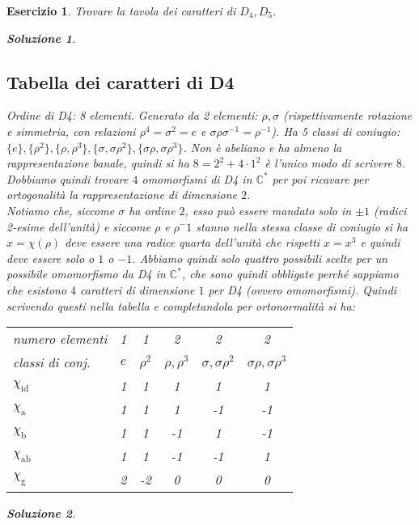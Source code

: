\documentclass[a4paper]{article}
\theoremstyle{break}
\newtheorem{ex}{{ \Large Esercizio} }
\theoremstyle{plain}
\newtheorem{sol}{Soluzione}[ex]
\newcommand{\bbC}{\mathbb{C}}
\begin{document}
\begin{ex}
Trovare la tavola dei caratteri di $D_4, D_5$.

\begin{sol}
\subsection{Tabella dei caratteri di D4}
	Ordine di D4: 8 elementi. Generato da 2 elementi: $\rho, \sigma$ (rispettivamente rotazione e simmetria, con relazioni $\rho^4 = \sigma^2 = e$ e $\sigma \rho \sigma^{-1} = \rho^{-1}$). Ha 5 classi di coniugio: $\{e\}, \{\rho^2\}, \{\rho, \rho^3\}, \{\sigma, \sigma\rho^2\}, \{\sigma\rho, \sigma\rho^3\}$. Non è abeliano e ha almeno la rappresentazione banale, quindi si ha $8 = 2^2 + 4 \cdot 1^2$ è l'unico modo di scrivere $8$. Dobbiamo quindi trovare $4$ omomorfismi di D4 in $\bbC^{*}$ per poi ricavare per ortogonalità la rappresentazione di dimensione $2$. \\
	Notiamo che, siccome $\sigma$ ha ordine $2$, esso può essere mandato solo in $\pm 1$ (radici 2-esime dell'unità) e siccome $\rho$ e $\rho^-1$ stanno nella stessa classe di coniugio si ha $x = \chi(\rho)$ deve essere una radice quarta dell'unità che rispetti $x = x^3$ e quindi deve essere solo o $1$ o $-1$. Abbiamo quindi solo quattro possibili scelte per un possibile omomorfismo da D4 in $\bbC^{*}$, che sono quindi obbligate perché sappiamo che esistono $4$ caratteri di dimensione $1$ per D4 (ovvero omomorfismi). Quindi scrivendo questi nella tabella e completandola per ortonormalità si ha: \\
	\begin{center} \begin{tabular}{lccccc}
	numero elementi   & 1   & 1   & 2   & 2   & 2   \\
	classi di conj.   & $e$  & $\rho^2$ & $\rho, \rho^3$ & $\sigma, \sigma\rho^2$ & $\sigma\rho, \sigma\rho^3$ \\ \hline
	$\chi_\text{id}$  & 1   & 1   & 1   & 1   & 1   \\
	$\chi_\text{a}$   & 1   & 1   & 1   & -1  & -1  \\
	$\chi_\text{b}$   & 1   & 1   & -1  & 1   & -1  \\
	$\chi_\text{ab}$  & 1   & 1   & -1  & -1  & 1   \\
	$\chi_\text{g}$   & 2   & -2  & 0   & 0   & 0   \\
	\end{tabular} \end{center} \vskip 0.5cm
\end{sol}

\begin{sol}

\end{sol}


\end{ex}
\end{document}
